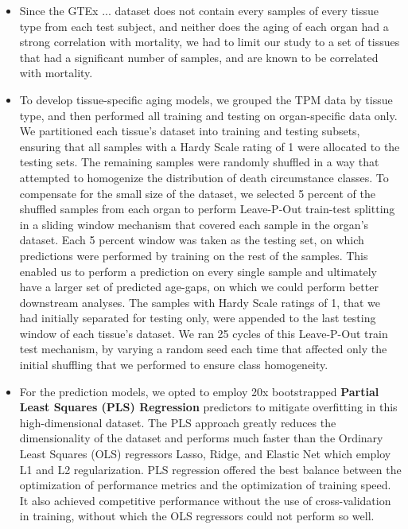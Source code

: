 \documentclass[twocolumn]{article}
\begin{document}
\begin{itemize}
    \item Since the GTEx ... dataset does not contain every samples of every tissue type from each test subject, and neither does the aging of each organ had a strong correlation with mortality, we had to limit our study to a set of tissues that had a significant number of samples, and are known to be correlated with mortality. \cite{cdc_data_brief_2023} \cite{seer_common_cancers_2024}

    \item To develop tissue-specific aging models, we grouped the TPM data by tissue type, and then performed all training and testing on organ-specific data only. We partitioned each tissue's dataset into training and testing subsets, ensuring that all samples with a Hardy Scale rating of 1 were allocated to the testing sets. The remaining samples were randomly shuffled in a way that attempted to homogenize the distribution of death circumstance classes. To compensate for the small size of the dataset, we selected 5 percent of the shuffled samples from each organ to perform Leave-P-Out train-test splitting in a sliding window mechanism that covered each sample in the organ's dataset. Each 5 percent window was taken as the testing set, on which predictions were performed by training on the rest of the samples. This enabled us to perform a prediction on every single sample and ultimately have a larger set of predicted age-gaps, on which we could perform better downstream analyses. The samples with Hardy Scale ratings of 1, that we had initially separated for testing only, were appended to the last testing window of each tissue's dataset. We ran 25 cycles of this Leave-P-Out train test mechanism, by varying a random seed each time that affected only the initial shuffling that we performed to ensure class homogeneity.

    \item For the prediction models, we opted to employ 20x bootstrapped \textbf{Partial Least Squares (PLS) Regression} predictors to mitigate overfitting in this high-dimensional dataset. The PLS approach greatly reduces the dimensionality of the dataset and performs much faster than the Ordinary Least Squares (OLS) regressors Lasso, Ridge, and Elastic Net which employ L1 and L2 regularization. PLS regression offered the best balance between the optimization of performance metrics and the optimization of training speed. It also achieved competitive performance without the use of cross-validation in training, without which the OLS regressors could not perform so well.


\end{itemize}
\end{document}
